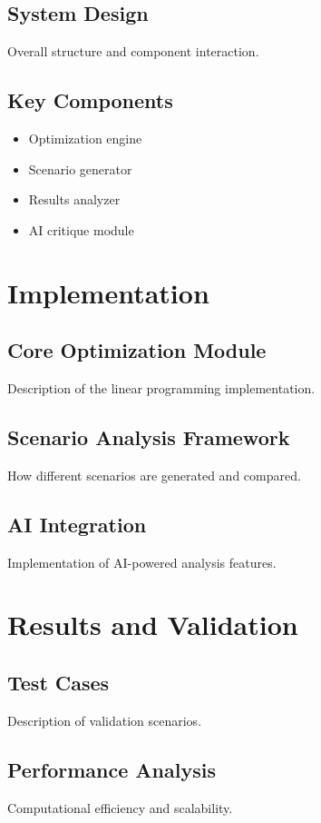 \documentclass{article}
\begin{document}
\subsection{System Design}
Overall structure and component interaction.

\subsection{Key Components}
\begin{itemize}
    \item Optimization engine
    \item Scenario generator
    \item Results analyzer
    \item AI critique module
\end{itemize}

\section{Implementation}
\subsection{Core Optimization Module}
Description of the linear programming implementation.

\subsection{Scenario Analysis Framework}
How different scenarios are generated and compared.

\subsection{AI Integration}
Implementation of AI-powered analysis features.

\section{Results and Validation}
\subsection{Test Cases}
Description of validation scenarios.

\subsection{Performance Analysis}
Computational efficiency and scalability.
\end{document}
